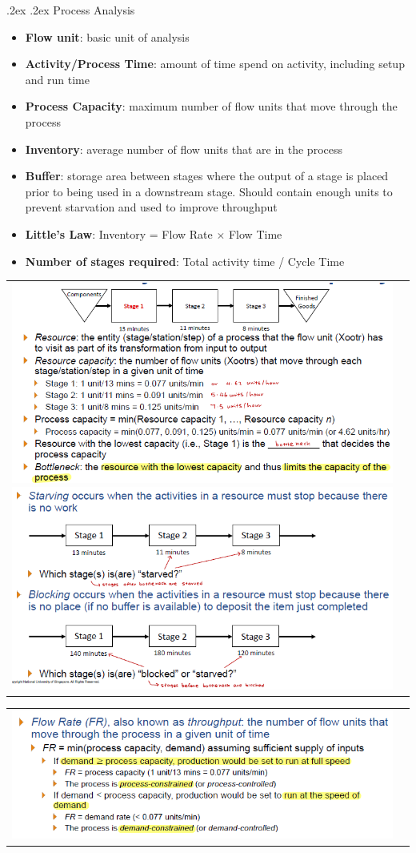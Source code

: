 \documentclass[10pt,landscape,a4paper]{article}
\makeatletter
\renewcommand{\subsection}{\@startsection{subsection}{1}{0mm}%
	{.2ex}%
	{.2ex}%
	{\sffamily\bfseries}}
\makeatother
\begin{document}
\begin{multicols*}{4}
		\subsection{Process Analysis}
		\begin{itemize}
			\item \textbf{Flow unit}: basic unit of analysis
			\item \textbf{Activity/Process Time}: amount of time spend on activity, including setup and run time
			\item \textbf{Process Capacity}: maximum number of flow units that move through the process 
			\item \textbf{Inventory}: average number of flow units that are in the process
			\item \textbf{Buffer}: storage area between stages where the output of a stage is placed prior to being used in a downstream stage. Should contain enough units to prevent starvation and used to improve throughput
			\item \textbf{Little's Law}: Inventory = Flow Rate $\times$ Flow Time
			\item \textbf{Number of stages required}: Total activity time / Cycle Time
		\end{itemize}
		\begin{tabular}{c c}
			\includegraphics[width=0.5\linewidth]{process_analysis_terms}
			\includegraphics[width=0.5\linewidth]{bottlenecks}
		\end{tabular}
		\begin{tabular}{c c}
			\includegraphics[width=0.5\linewidth]{flow_rate}

\end{tabular}
\end{multicols*}
\end{document}
